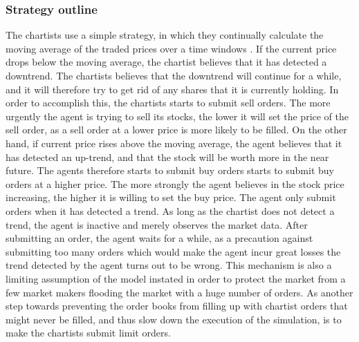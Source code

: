 \subsubsection{Strategy outline}
The chartists use a simple strategy, in which they continually calculate the moving average of the traded prices over a time windows \cite{izumi2009evaluation}. If the current price drops below the moving average, the chartist believes that it has detected a downtrend. The chartists believes that the downtrend will continue for a while, and it will therefore try to get rid of any shares that it is currently holding. In order to accomplish this, the chartists starts to submit sell orders. The more urgently the agent is trying to sell its stocks, the lower it will set the price of the sell order, as a sell order at a lower price is more likely to be filled. On the other hand, if current price rises above the moving average, the agent believes that it has detected an up-trend, and that the stock will be worth more in the near future. The agents therefore starts to submit buy orders starts to submit buy orders at a higher price. The more strongly the agent believes in the stock price increasing, the higher it is willing to set the buy price. The agent only submit orders when it has detected a trend. As long as the chartist does not detect a trend, the agent is inactive and merely observes the market data.  After submitting an order, the agent waits for a while, as a precaution against submitting too many orders which would make the agent incur great losses the trend detected by the agent turns out to be wrong. This mechanism is also a limiting assumption of the model instated in order to protect the market from a few market makers flooding the market with a huge number of orders. As another step towards preventing the order books from filling up with chartist orders that might never be filled, and thus slow down the execution of the simulation, is to make the chartists submit limit orders.

